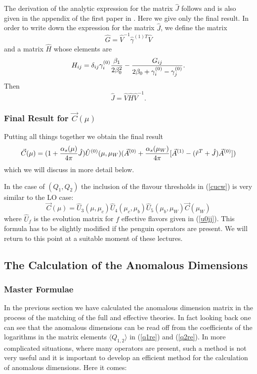 \documentclass[12pt]{article}
\def\as{\alpha_s}
\begin{document}
\begin{itemize}
\begin{itemize}
\begin{itemize}
The derivation of the analytic expression for the matrix $\hat J$ follows
\cite{AB80} and is also given in the appendix of the first paper in
\cite{BJLW1}. Here we give
only the final result.
In order to write down the expression for the matrix $\hat J$,
 we define the matrix
\begin{equation}\label{gvg1} 
\hat G=\hat V^{-1} {\hat\gamma^{(1)T}} \hat V   \end{equation}
and a matrix $\hat H$ whose elements are
\begin{equation}\label{sij} 
H_{ij}=\delta_{ij}\gamma^{(0)}_i{\beta_1\over 2\beta^2_0}-
    {G_{ij}\over 2\beta_0+\gamma^{(0)}_i-\gamma^{(0)}_j}.  \end{equation}
Then
\begin{equation}\label{jvs} \hat J=\hat V \hat H \hat V^{-1}.
 \end{equation}

\subsubsection{Final Result for $\vec C(\mu)$}
Putting all things together we obtain the final result
\begin{equation}\label{cjua} 
\vec C(\mu)=(1+{\as(\mu)\over 4\pi} \hat J)\hat U^{(0)}(\mu,\mu_W)
(\vec A^{(0)}+{\as(\mu_W)\over 4\pi}[\vec A^{(1)}
-(\hat r^T+\hat J)\vec A^{(0)}])\end{equation}
which we will discuss in more detail below.

In the case of $(Q_1,Q_2)$ the inclusion of the flavour thresholds in 
(\ref{cucw}) is very similar to the  LO case:
\begin{equation}\label{cthrP}
\vec C(\mu)=\hat U_3(\mu,\mu_c)\hat U_4(\mu_c,\mu_b)
\hat U_5(\mu_b,\mu_W)\vec C(\mu_W)  \end{equation}
where $\hat U_f$ is the evolution matrix for $f$ effective flavors
given in (\ref{u0jj}). This formula has to be slightly modified
if the penguin operators are present. We will return to this point
at a suitable moment of these lectures.

\subsection{The Calculation of the Anomalous Dimensions}
               \label{sec:basicform:wc:adm}
\subsubsection{Master Formulae}
In the previous section we have calculated the anomalous dimension
matrix in the process of the matching of the full and effective
theories. In fact looking back one can see that the anomalous dimensions
can be read off from the coefficients of the logarithms in the matrix
elements $\langle Q_{1,2}\rangle$ in (\ref{q1re}) and (\ref{q2re}).
In more complicated situations, where many operators are present,
such a method is not very useful and it is important
to develop an efficient method for the calculation of 
anomalous dimensions. Here it comes:


\end{itemize}
\end{itemize}
\end{itemize}
\end{document}
